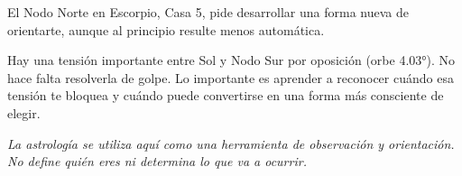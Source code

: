 \documentclass[11pt,a4paper]{article}
\begin{document}
El Nodo Norte en Escorpio, Casa 5, pide desarrollar una forma nueva de orientarte, aunque al principio resulte menos automática.

Hay una tensión importante entre Sol y Nodo Sur por oposición (orbe 4.03°). No hace falta resolverla de golpe. Lo importante es aprender a reconocer cuándo esa tensión te bloquea y cuándo puede convertirse en una forma más consciente de elegir.

\vspace{1cm}

\begin{center}
{\small\itshape\color{grisai}
La astrología se utiliza aquí como una herramienta de observación y orientación.
No define quién eres ni determina lo que va a ocurrir.
}
\end{center}
\end{document}
